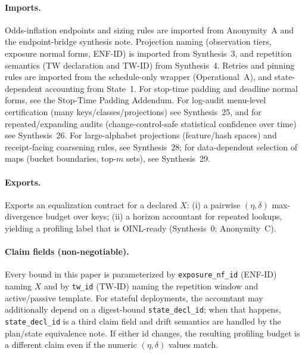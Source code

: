 \documentclass[11pt]{article}
\begin{document}
\paragraph{Imports.}
Odds-inflation endpoints and sizing rules are imported from Anonymity~A and the endpoint-bridge synthesis note.\cite{series:oddsinflation,series:endpointbridge}
Projection naming (observation tiers, exposure normal forms, ENF-ID) is imported from Synthesis~3, and repetition semantics (TW declaration and TW-ID) from Synthesis~4.\cite{series:traceifaces,series:threatwindows}
Retries and pinning rules are imported from the schedule-only wrapper (Operational~A), and state-dependent accounting from State~1.\cite{series:operationalA,series:state1}
For stop-time padding and deadline normal forms, see the Stop-Time Padding Addendum.\cite{series:stoptimeaddendum}
For log-audit menu-level certification (many keys/classes/projections) see Synthesis~25, and for repeated/expanding audits (change-control-safe statistical confidence over time) see Synthesis~26.\cite{series:stataudit,series:anytimespend}
For large-alphabet projections (feature/hash spaces) and receipt-facing coarsening rules, see Synthesis~28; for data-dependent selection of maps (bucket boundaries, top-$m$ sets), see Synthesis~29.\cite{series:coarsening,series:selectiondiscipline}

\paragraph{Exports.}
Exports an equalization contract for a declared $X$:
(i) a pairwise $(\eta,\delta)$ max-divergence budget over keys;
(ii) a horizon accountant for repeated lookups, yielding a profiling label that is OINL-ready (Synthesis~0; Anonymity~C).\cite{series:contractobjects,series:abomoinl}

\paragraph{Claim fields (non-negotiable).}
Every bound in this paper is parameterized by \texttt{exposure\_nf\_id} (ENF-ID) naming $X$ and by \texttt{tw\_id} (TW-ID) naming the repetition window and active/passive template. For stateful deployments, the accountant may additionally depend on a digest-bound \texttt{state\_decl\_id}; when that happens, \texttt{state\_decl\_id} is a third claim field and drift semantics are handled by the plan/state equivalence note.\cite{series:planstateequiv}
If either id changes, the resulting profiling budget is a different claim even if the numeric $(\eta,\delta)$ values match.\cite{series:traceifaces,series:threatwindows}
\end{document}
